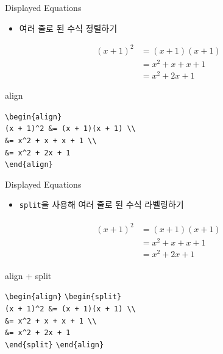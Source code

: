 \documentclass[12pt]{gshs_lecture}
\newcommand{\tb}{\textbackslash}
\newenvironment{codeblock}[1]{
	\begin{block}{#1}
		\setstretch{1.0}
		\begin{small}
}{
		\end{small}
	\end{block}
}
\begin{document}
\begin{frame}[t]{Displayed Equations}
	
	\begin{itemize}
		\item 여러 줄로 된 수식 정렬하기
	\end{itemize}
	\begin{align}
	(x + 1)^2 &= (x + 1)(x + 1)\\
	&= x^2 + x + x + 1\\
	&= x^2 + 2x + 1
	\end{align}
	
	\begin{codeblock}{align}	
		\texttt{\tb begin\{align\}}\\
		\hspace{6mm} \texttt{(x + 1)\^{}2 \&= (x + 1)(x + 1) \tb\tb}\\
		\hspace{6mm} \texttt{\&= x\^{}2 + x + x + 1 \tb\tb}\\
		\hspace{6mm} \texttt{\&= x\^{}2 + 2x + 1}\\
		\texttt{\tb end\{align\}}
	\end{codeblock}
	
\end{frame}

\begin{frame}[t]{Displayed Equations}
	
	\begin{itemize}
		\item \texttt{split}을 사용해 여러 줄로 된 수식 라벨링하기
	\end{itemize}
	\begin{align}
	\begin{split}
	(x + 1)^2 &= (x + 1)(x + 1)\\
	&= x^2 + x + x + 1\\
	&= x^2 + 2x + 1
	\end{split}
	\end{align}
	
	\begin{codeblock}{align + split}	
		\texttt{\tb begin\{align\}}
		\texttt{\tb begin\{split\}}\\
		\hspace{6mm} \texttt{(x + 1)\^{}2 \&= (x + 1)(x + 1) \tb\tb}\\
		\hspace{6mm} \texttt{\&= x\^{}2 + x + x + 1 \tb\tb}\\
		\hspace{6mm} \texttt{\&= x\^{}2 + 2x + 1}\\
		\texttt{\tb end\{split\}}
		\texttt{\tb end\{align\}}
	\end{codeblock}
	
\end{frame}
\end{document}
